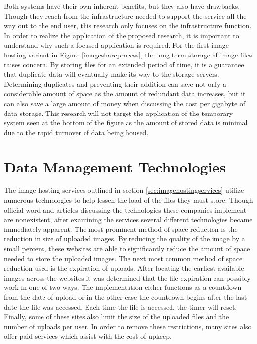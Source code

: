 Both systems have their own inherent benefits, but they also have drawbacks. Though they reach from the infrastructure needed to support the service all the way out to the end user, this research only focuses on the infrastructure function. In order to realize the application of the proposed research, it is important to understand why such a focused application is required. For the first image hosting variant in Figure \ref{imageshareprocess}, the long term storage of image files raises concern. By storing files for an extended period of time, it is a guarantee that duplicate data will eventually make its way to the storage servers. Determining duplicates and preventing their addition can save not only a considerable amount of space as the amount of redundant data increases, but it can also save a large amount of money when discussing the cost per gigabyte of data storage. This research will not target the application of the temporary system seen at the bottom of the figure as the amount of stored data is minimal due to the rapid turnover of data being housed.

\section{Data Management Technologies} \label{sec:datadeduptech}
The image hosting services outlined in section \ref{sec:imagehostingservices} utilize numerous technologies to help lessen the load of the files they must store. Though official word and articles discussing the technologies these companies implement are nonexistent, after examining the services several different technologies became immediately apparent. The most prominent method of space reduction is the reduction in size of uploaded images. By reducing the quality of the image by a small percent, these websites are able to significantly reduce the amount of space needed to store the uploaded images. The next most common method of space reduction used is the expiration of uploads. After locating the earliest available images across the websites it was determined that the file expiration can possibly work in one of two ways. The implementation either functions as a countdown from the date of upload or in the other case the countdown begins after the last date the file was accessed. Each time the file is accessed, the timer will reset. Finally, some of these sites also limit the size of the uploaded files and the number of uploads per user. In order to remove these restrictions, many sites also offer paid services which assist with the cost of upkeep. 

